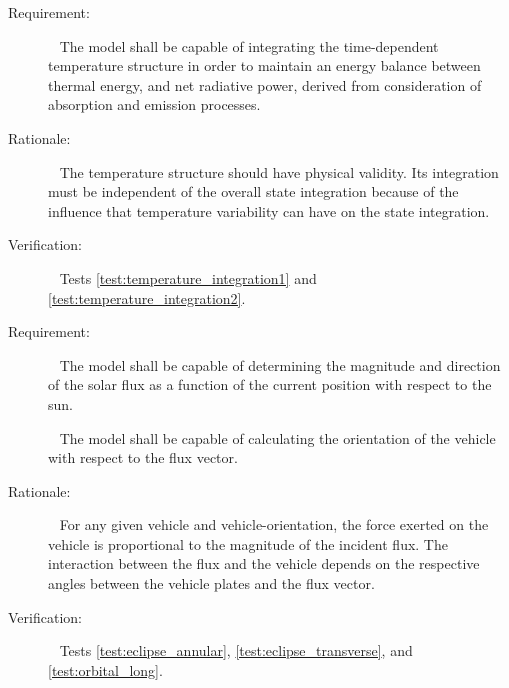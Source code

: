 \label{reqt:functional_temperature}
\begin{description}
  \item[Requirement:]\ \newline
      The model shall be capable of integrating the time-dependent temperature
      structure in order to maintain an energy balance between thermal energy, and
      net radiative power, derived from consideration of absorption and emission
      processes.
	\item[Rationale:]\ \newline
	  The temperature structure should have physical validity.  Its integration must be independent of the overall state integration because of the influence that temperature variability can have on the state integration.
	\item[Verification:]\ \newline
	  Tests \vref{test:temperature_integration1} and \vref{test:temperature_integration2}.
\end{description}

\label{reqt:functional_flux}
\begin{description}
  \item[Requirement:]\ \newline
    The model shall be capable of determining the magnitude and direction of
    the solar flux as a function of the current position with respect to the
    sun.

    \ \newline
      The model shall be capable of calculating the orientation of the vehicle
      with respect to the flux vector.

  \item[Rationale:]\ \newline
    For any given vehicle and vehicle-orientation, the force exerted on the
    vehicle is proportional to the magnitude of the incident flux.
    The interaction between the flux and the vehicle depends on
    the respective angles between the vehicle plates and the flux vector.

  \item[Verification:]\ \newline
    Tests \vref{test:eclipse_annular}, \vref{test:eclipse_transverse}, and \vref{test:orbital_long}.
\end{description}


